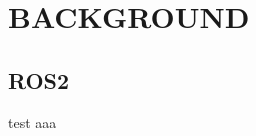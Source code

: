 \section{BACKGROUND}
\label{sec: background}


\subsection{ROS2}
\label{ssec: ros2}

\begin{frame}{test}
    aaa

    \centering

\end{frame}
